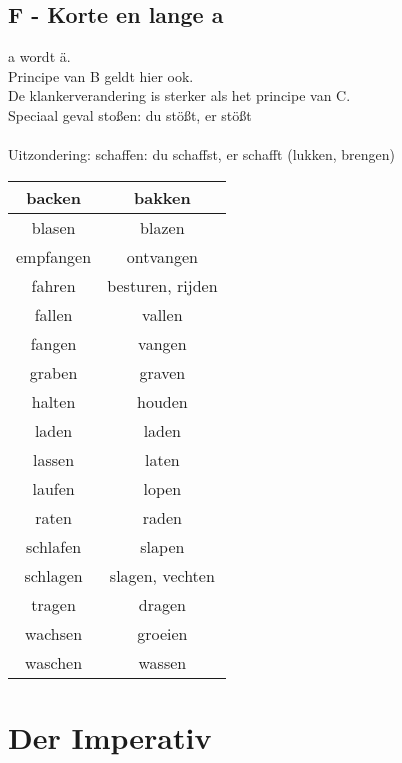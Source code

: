 \documentclass[main.tex]{subfiles}
\begin{document}
\subsection{F - Korte en lange a}
\begin{minipage}{0.5\textwidth}
a wordt ä.\\
Principe van B geldt hier ook.\\
De klankerverandering is sterker als het principe van C.\\
Speciaal geval stoßen: du stößt, er stößt\\
\\
Uitzondering: schaffen: du schaffst, er schafft		(lukken, brengen)
\end{minipage}
\begin{minipage}{0.5\textwidth}
\begin{tabular}{|c|c|}
\hline 
backen & bakken \\ 
\hline 
blasen & blazen \\ 
\hline 
empfangen & ontvangen \\ 
\hline 
fahren & besturen, rijden \\ 
\hline 
fallen & vallen \\ 
\hline 
fangen & vangen \\ 
\hline 
graben & graven \\ 
\hline 
halten & houden \\ 
\hline 
laden & laden \\ 
\hline 
lassen & laten \\ 
\hline 
laufen & lopen \\ 
\hline 
raten & raden \\ 
\hline 
schlafen & slapen \\ 
\hline 
schlagen & slagen, vechten \\ 
\hline 
tragen & dragen \\ 
\hline 
wachsen & groeien \\ 
\hline 
waschen & wassen \\ 
\hline 
\end{tabular} 
\end{minipage}
\section{Der Imperativ}
\end{document}
